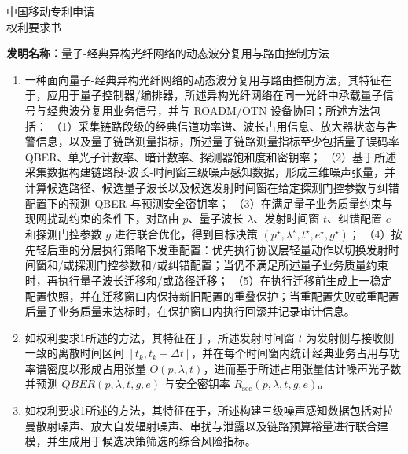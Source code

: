 \documentclass[12pt,a4paper]{article}
\begin{document}
\begin{center}
    {\Large\heiti 中国移动专利申请} \\[0.5em]
    {\Huge\heiti 权利要求书} \\[0.8em]
\end{center}

\noindent\textbf{发明名称：}量子-经典异构光纤网络的动态波分复用与路由控制方法

\vspace{0.8em}

\begin{enumerate}[
    label=\arabic*.,
    leftmargin=0pt,
    itemindent=2em,
    labelsep=0.5em,
    align=left,
    itemsep=0.6em,
    topsep=0pt
]

\item 一种面向量子-经典异构光纤网络的动态波分复用与路由控制方法，其特征在于，应用于量子控制器/编排器，所述异构光纤网络在同一光纤中承载量子信号与经典波分复用业务信号，并与 ROADM/OTN 设备协同；所述方法包括：
（1）采集链路段级的经典信道功率谱、波长占用信息、放大器状态与告警信息，以及量子链路测量指标，所述量子链路测量指标至少包括量子误码率 QBER、单光子计数率、暗计数率、探测器饱和度和密钥率；
（2）基于所述采集数据构建链路段-波长-时间窗三级噪声感知数据，形成三维噪声张量，并计算候选路径、候选量子波长以及候选发射时间窗在给定探测门控参数与纠错配置下的预测 QBER 与预测安全密钥率；
（3）在满足量子业务质量约束与现网扰动约束的条件下，对路由 $p$、量子波长 $\lambda$、发射时间窗 $t$、纠错配置 $e$ 和探测门控参数 $g$ 进行联合优化，得到目标决策 $(p^\star,\lambda^\star,t^\star,e^\star,g^\star)$；
（4）按先轻后重的分层执行策略下发重配置：优先执行协议层轻量动作以切换发射时间窗和/或探测门控参数和/或纠错配置；当仍不满足所述量子业务质量约束时，再执行量子波长迁移和/或路径迁移；
（5）在执行迁移前生成上一稳定配置快照，并在迁移窗口内保持新旧配置的重叠保护；当重配置失败或重配置后量子业务质量未达标时，在保护窗口内执行回滚并记录审计信息。

\item 如权利要求1所述的方法，其特征在于，所述发射时间窗 $t$ 为发射侧与接收侧一致的离散时间区间 $[t_k, t_k+\Delta t]$，并在每个时间窗内统计经典业务占用与功率谱密度以形成占用张量 $O(p,\lambda,t)$，进而基于所述占用张量估计噪声光子数并预测 $QBER(p,\lambda,t,g,e)$ 与安全密钥率 $R_{\mathrm{sec}}(p,\lambda,t,g,e)$。

\item 如权利要求1所述的方法，其特征在于，所述构建三级噪声感知数据包括对拉曼散射噪声、放大自发辐射噪声、串扰与泄露以及链路预算裕量进行联合建模，并生成用于候选决策筛选的综合风险指标。


\end{enumerate}
\end{document}
